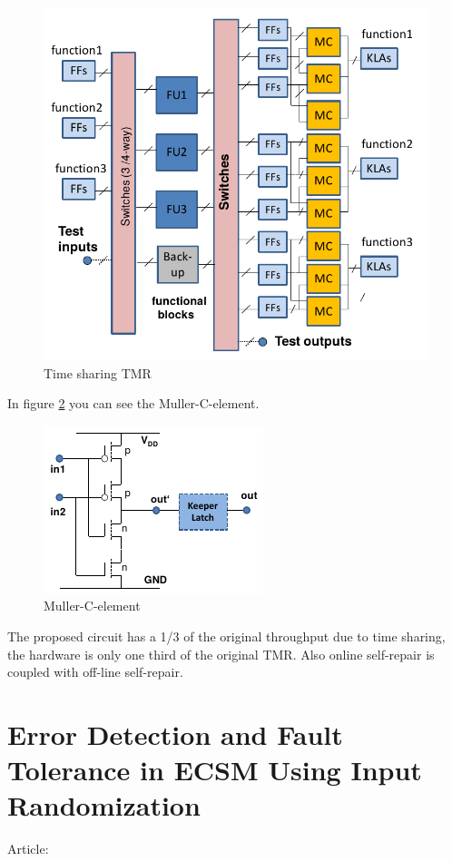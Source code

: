 {{\begin{figure}[H]
			\includegraphics[scale=0.3]{./images/Articles_image/Combining_FT_and_self_repairing_ST_TMR_self_rep.png}
			\caption{Time sharing TMR}
			\label{fig:timesharingtmr_selfrep}
		\end{figure}
		In figure 	\ref{fig:timesharingtmr_Muller} you can see the Muller-C-element.
		\begin{figure}[H]
			\centering
			\includegraphics[scale=0.5]{./images/Articles_image/Combining_FT_and_self_repairing_Muller_C_element.png}
			\caption{Muller-C-element}
			\label{fig:timesharingtmr_Muller}
		\end{figure}	
		The proposed circuit has a 1/3 of the original throughput due to time sharing, the hardware is only one third of the original TMR. Also online self-repair is coupled with off-line self-repair.
	}
	\section{Error Detection and Fault Tolerance in ECSM Using Input Randomization}{
		Article:  \cite{Error_Detection_and_Fault_Tolerance_in_ECSM_Using_Input_Randomization}
		
}}
